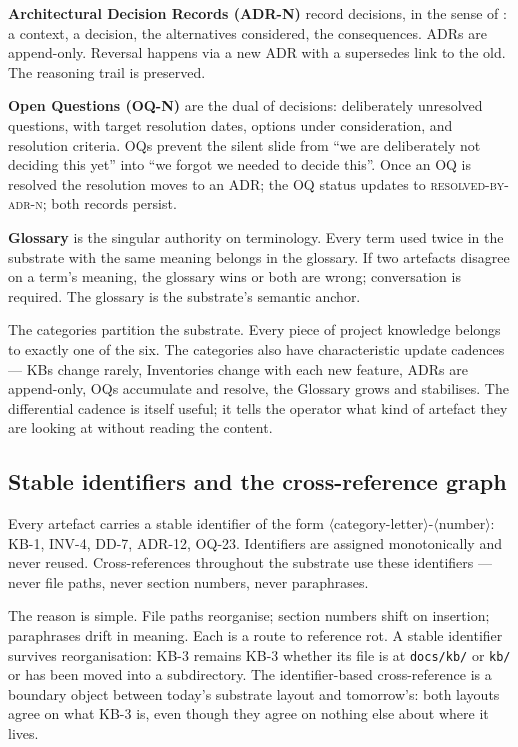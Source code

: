 \documentclass[11pt,a4paper,twocolumn]{article}
\begin{document}
\textbf{Architectural Decision Records (ADR-N)} record decisions, in
the sense of \citet{nygard2011adr}: a context, a decision, the
alternatives considered, the consequences. ADRs are append-only.
Reversal happens via a new ADR with a supersedes link to the old.
The reasoning trail is preserved.

\textbf{Open Questions (OQ-N)} are the dual of decisions:
deliberately unresolved questions, with target resolution dates,
options under consideration, and resolution criteria. OQs prevent
the silent slide from ``we are deliberately not deciding this yet''
into ``we forgot we needed to decide this''. Once an OQ is resolved
the resolution moves to an ADR; the OQ status updates to
\textsc{resolved-by-adr-n}; both records persist.

\textbf{Glossary} is the singular authority on terminology. Every
term used twice in the substrate with the same meaning belongs in
the glossary. If two artefacts disagree on a term's meaning, the
glossary wins or both are wrong; conversation is required. The
glossary is the substrate's semantic anchor.

The categories partition the substrate. Every piece of project
knowledge belongs to exactly one of the six. The categories also
have characteristic update cadences --- KBs change rarely,
Inventories change with each new feature, ADRs are append-only, OQs
accumulate and resolve, the Glossary grows and stabilises. The
differential cadence is itself useful; it tells the operator
what kind of artefact they are looking at without reading the
content.

\subsection{Stable identifiers and the cross-reference graph}

Every artefact carries a stable identifier of the form
$\langle$category-letter$\rangle$-$\langle$number$\rangle$: KB-1,
INV-4, DD-7, ADR-12, OQ-23. Identifiers are assigned monotonically
and never reused. Cross-references throughout the substrate use
these identifiers --- never file paths, never section numbers,
never paraphrases.

The reason is simple. File paths reorganise; section numbers shift
on insertion; paraphrases drift in meaning. Each is a route to
reference rot. A stable identifier survives reorganisation: KB-3
remains KB-3 whether its file is at \texttt{docs/kb/} or
\texttt{kb/} or has been moved into a subdirectory. The
identifier-based cross-reference is a boundary object
\citep{star1989boundary} between today's substrate layout and
tomorrow's: both layouts agree on what KB-3 is, even though they
agree on nothing else about where it lives.
\end{document}
